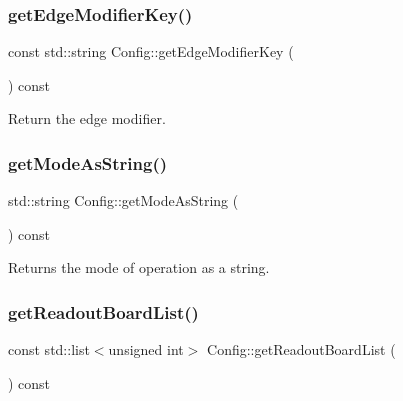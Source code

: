 \mbox{\label{class_config_ae702b1e2139529bb2dc39905d7b35d12}} 
\subsubsection{\texorpdfstring{get\+Edge\+Modifier\+Key()}{getEdgeModifierKey()}}
{\footnotesize\ttfamily const std\+::string Config\+::get\+Edge\+Modifier\+Key (\begin{DoxyParamCaption}{ }\end{DoxyParamCaption}) const\hspace{0.3cm}{\ttfamily [inline]}}



Return the edge modifier. 

\mbox{\label{class_config_a3bd48a0ae54bfd982c02564160d6762b}} 
\subsubsection{\texorpdfstring{get\+Mode\+As\+String()}{getModeAsString()}}
{\footnotesize\ttfamily std\+::string Config\+::get\+Mode\+As\+String (\begin{DoxyParamCaption}{ }\end{DoxyParamCaption}) const\hspace{0.3cm}{\ttfamily [private]}}



Returns the mode of operation as a string. 

\mbox{\label{class_config_a197838ef4fbdf274759c01f612666e93}} 
\subsubsection{\texorpdfstring{get\+Readout\+Board\+List()}{getReadoutBoardList()}}
{\footnotesize\ttfamily const std\+::list$<$unsigned int$>$ Config\+::get\+Readout\+Board\+List (\begin{DoxyParamCaption}{ }\end{DoxyParamCaption}) const\hspace{0.3cm}{\ttfamily [inline]}}



